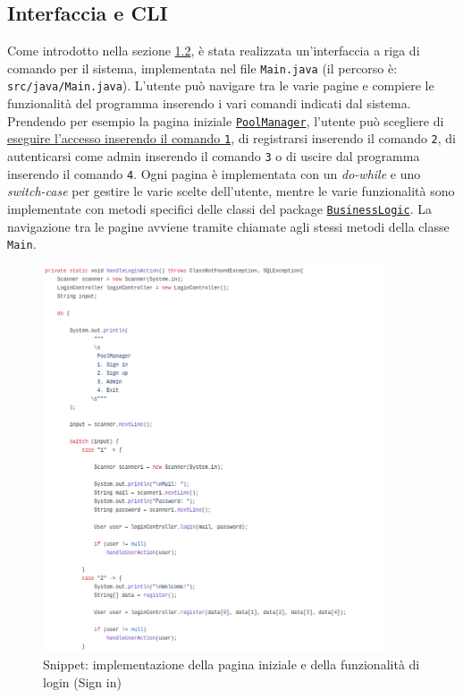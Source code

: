 \documentclass{article}
\begin{document}
{\subsection{Interfaccia e CLI}\label{subsec:interfaccia-cli}
Come introdotto nella sezione \hyperref[subsec:struttura-e-pratiche-utilizzate]{1.2}, è stata realizzata un'interfaccia a riga di comando per il sistema, implementata nel file \texttt{Main.java} (il percorso è: \texttt{src/java/Main.java}).
            L'utente può navigare tra le varie pagine e compiere le funzionalità del programma inserendo i vari comandi indicati dal sistema.
            Prendendo per esempio la pagina iniziale \hyperref[fig:navigation-diagram]{\texttt{PoolManager}}, l'utente può scegliere di \hyperref[fig:main]{eseguire l'accesso inserendo il comando \texttt{1}},
            di registrarsi inserendo il comando \texttt{2}, di autenticarsi come admin inserendo il comando \texttt{3} o di uscire dal programma inserendo il comando \texttt{4}.
            Ogni pagina è implementata con un \textit{do-while} e uno \textit{switch-case} per gestire le varie scelte dell'utente, mentre le varie funzionalità
            sono implementate con metodi specifici delle classi del package \hyperref[subsec:BusinessLogic]{\texttt{BusinessLogic}}.
            La navigazione tra le pagine avviene tramite chiamate agli stessi metodi della classe \texttt{Main}.
\begin{figure}[H]
                \centering
                \includegraphics[width=0.9\textwidth]{Images/Snippets/Main.png}
                \captionsetup{labelformat=empty,labelsep=none}
                \caption{Snippet: implementazione della pagina iniziale e della funzionalità di login (Sign in)}
                \label{fig:main}
            \end{figure}
\newpage
}
\end{document}
